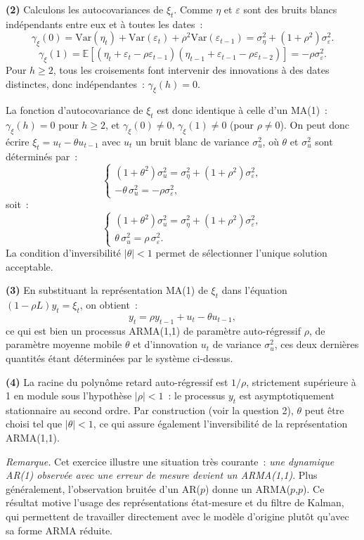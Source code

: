 \documentclass[11pt,a4paper,notitlepage]{article}
\newcommand{\question}[1]{\textbf{(#1)}}
\begin{document}
\question{2} Calculons les autocovariances de $\xi_t$. Comme
$\eta$ et $\varepsilon$ sont des bruits blancs indépendants entre eux
et à toutes les dates~:
\[
\gamma_{\xi}(0) = \mathrm{Var}(\eta_t) + \mathrm{Var}(\varepsilon_t) + \rho^2 \mathrm{Var}(\varepsilon_{t-1})
= \sigma_{\eta}^2 + (1+\rho^2)\sigma_{\varepsilon}^2.
\]
\[
\gamma_{\xi}(1) = \mathbb E[(\eta_t+\varepsilon_t-\rho\varepsilon_{t-1})(\eta_{t-1}+\varepsilon_{t-1}-\rho\varepsilon_{t-2})]
= -\rho\sigma_{\varepsilon}^2.
\]
Pour $h\geq 2$, tous les croisements font intervenir des innovations à
des dates distinctes, donc indépendantes~: $\gamma_{\xi}(h) = 0$.\newline

La fonction d'autocovariance de $\xi_t$ est donc identique à celle
d'un MA(1)~: $\gamma_{\xi}(h) = 0$ pour $h\geq 2$, et $\gamma_{\xi}(0)
\neq 0$, $\gamma_{\xi}(1)\neq 0$ (pour $\rho\neq 0$). On peut donc
écrire $\xi_t = u_t - \theta u_{t-1}$ avec $u_t$ un bruit blanc de
variance $\sigma_u^2$, où $\theta$ et $\sigma_u^2$ sont déterminés par~:
\[
\begin{cases}
(1+\theta^2)\sigma_u^2 = \sigma_{\eta}^2 + (1+\rho^2)\sigma_{\varepsilon}^2,\\
-\theta\,\sigma_u^2 = -\rho\sigma_{\varepsilon}^2,
\end{cases}
\]
soit~:
\[
\boxed{\;
\begin{cases}
(1+\theta^2)\sigma_u^2 = \sigma_{\eta}^2 + (1+\rho^2)\sigma_{\varepsilon}^2,\\
\theta\,\sigma_u^2 = \rho\,\sigma_{\varepsilon}^2.
\end{cases}\;}
\]
La condition d'inversibilité $|\theta|<1$ permet de sélectionner
l'unique solution acceptable.\newline

\question{3} En substituant la représentation MA(1) de $\xi_t$ dans
l'équation $(1-\rho L)y_t = \xi_t$, on obtient~:
\[
y_t = \rho y_{t-1} + u_t - \theta u_{t-1},
\]
ce qui est bien un processus ARMA(1,1) de paramètre auto-régressif
$\rho$, de paramètre moyenne mobile $\theta$ et d'innovation $u_t$ de
variance $\sigma_u^2$, ces deux dernières quantités étant déterminées
par le système ci-dessus.\newline

\question{4} La racine du polynôme retard auto-régressif est $1/\rho$,
strictement supérieure à 1 en module sous l'hypothèse $|\rho|<1$~: le
processus $y_t$ est asymptotiquement stationnaire au second ordre. Par
construction (voir la question 2), $\theta$ peut être choisi tel que
$|\theta|<1$, ce qui assure également l'inversibilité de la
représentation ARMA(1,1).

\bigskip

\textit{Remarque.} Cet exercice illustre une situation très courante~:
\emph{une dynamique AR(1) observée avec une erreur de mesure devient
  un ARMA(1,1)}. Plus généralement, l'observation bruitée d'un AR($p$)
donne un ARMA($p$,$p$). Ce résultat motive l'usage des
représentations état-mesure et du filtre de Kalman, qui permettent de
travailler directement avec le modèle d'origine plutôt qu'avec sa
forme ARMA réduite.
\end{document}

